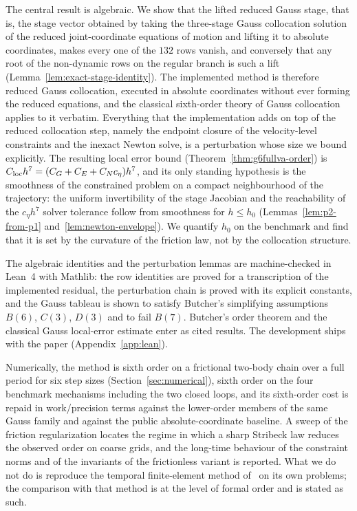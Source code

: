 The central result is algebraic. We show that the lifted reduced Gauss stage, that is, the stage
vector obtained by taking the three-stage Gauss collocation solution of the reduced joint-coordinate
equations of motion and lifting it to absolute coordinates, makes every one of the $132$ rows
vanish, and conversely that any root of the non-dynamic rows on the regular branch is such a lift
(Lemma~\ref{lem:exact-stage-identity}). The implemented method is therefore reduced Gauss
collocation, executed in absolute coordinates without ever forming the reduced equations, and the
classical sixth-order theory of Gauss collocation applies to it verbatim. Everything that the
implementation adds on top of the reduced collocation step, namely the endpoint closure of the
velocity-level constraints and the inexact Newton solve, is a perturbation whose size we bound
explicitly. The resulting local error bound (Theorem~\ref{thm:g6fullva-order}) is
$C_{\rm loc}h^7 = (C_G + C_E + C_N c_\eta)h^7$, and its only standing hypothesis is the smoothness
of the constrained problem on a compact neighbourhood of the trajectory: the uniform invertibility
of the stage Jacobian and the reachability of the $c_\eta h^7$ solver tolerance follow from
smoothness for $h\le h_0$ (Lemmas~\ref{lem:p2-from-p1} and~\ref{lem:newton-envelope}). We quantify
$h_0$ on the benchmark and find that it is set by the curvature of the friction law, not by the
collocation structure.

The algebraic identities and the perturbation lemmas are machine-checked in Lean~4 with Mathlib:
the row identities are proved for a transcription of the implemented residual, the perturbation
chain is proved with its explicit constants, and the Gauss tableau is shown to satisfy Butcher's
simplifying assumptions $B(6)$, $C(3)$, $D(3)$ and to fail $B(7)$. Butcher's order theorem and the
classical Gauss local-error estimate enter as cited results. The development ships with the paper
(Appendix~\ref{app:lean}).

Numerically, the method is sixth order on a frictional two-body chain over a full period for six
step sizes (Section~\ref{sec:numerical}), sixth order on the four benchmark mechanisms including
the two closed loops, and its sixth-order cost is repaid in work/precision terms against the
lower-order members of the same Gauss family and against the public absolute-coordinate baseline.
A sweep of the friction regularization locates the regime in which a sharp Stribeck law reduces the
observed order on coarse grids, and the long-time behaviour of the constraint norms and of the
invariants of the frictionless variant is reported. What we do not do is reproduce the temporal
finite-element method of~\cite{chaturvedi2026tfe} on its own problems; the comparison with that
method is at the level of formal order and is stated as such.

